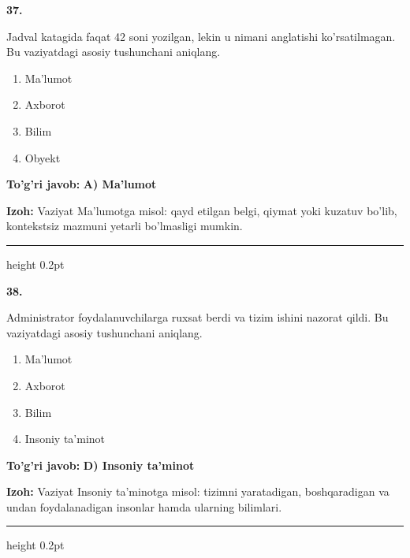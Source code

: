 \documentclass[10pt,a4paper,oneside]{article}
\begin{document}
\noindent\textbf{\color{ink}37.}
\par
Jadval katagida faqat 42 soni yozilgan, lekin u nimani anglatishi ko'rsatilmagan. Bu vaziyatdagi asosiy tushunchani aniqlang.
\begin{enumerate}[label=\Alph*),leftmargin=9mm]
\item Ma'lumot
\item Axborot
\item Bilim
\item Obyekt
\end{enumerate}
\begin{tcolorbox}[enhanced,breakable,colback=teal!4,colframe=teal!50!black,boxrule=0.5pt,arc=1.1mm,left=3mm,right=3mm,top=1.7mm,bottom=1.7mm,before skip=2mm,after skip=2mm]
\textbf{\color{teal}To'g'ri javob:} \textbf{A) Ma'lumot}
\par\smallskip
\textbf{Izoh:} Vaziyat Ma'lumotga misol: qayd etilgan belgi, qiymat yoki kuzatuv bo'lib, kontekstsiz mazmuni yetarli bo'lmasligi mumkin.
\end{tcolorbox}
\vspace{2mm}\hrule height 0.2pt \vspace{3mm}

\noindent\textbf{\color{ink}38.}
\par
Administrator foydalanuvchilarga ruxsat berdi va tizim ishini nazorat qildi. Bu vaziyatdagi asosiy tushunchani aniqlang.
\begin{enumerate}[label=\Alph*),leftmargin=9mm]
\item Ma'lumot
\item Axborot
\item Bilim
\item Insoniy ta'minot
\end{enumerate}
\begin{tcolorbox}[enhanced,breakable,colback=teal!4,colframe=teal!50!black,boxrule=0.5pt,arc=1.1mm,left=3mm,right=3mm,top=1.7mm,bottom=1.7mm,before skip=2mm,after skip=2mm]
\textbf{\color{teal}To'g'ri javob:} \textbf{D) Insoniy ta'minot}
\par\smallskip
\textbf{Izoh:} Vaziyat Insoniy ta'minotga misol: tizimni yaratadigan, boshqaradigan va undan foydalanadigan insonlar hamda ularning bilimlari.
\end{tcolorbox}
\vspace{2mm}\hrule height 0.2pt \vspace{3mm}
\end{document}
